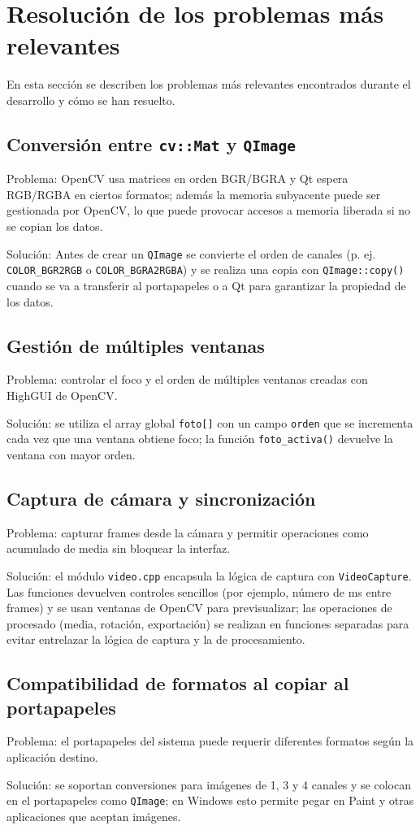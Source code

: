 \section{Resolución de los problemas más relevantes}

En esta sección se describen los problemas más relevantes encontrados durante el desarrollo y cómo se han resuelto.

\subsection{Conversión entre \texttt{cv::Mat} y \texttt{QImage}}

Problema: OpenCV usa matrices en orden BGR/BGRA y Qt espera RGB/RGBA en ciertos formatos; además la memoria subyacente puede ser gestionada por OpenCV, lo que puede provocar accesos a memoria liberada si no se copian los datos.

Solución: Antes de crear un \texttt{QImage} se convierte el orden de canales (p. ej. \texttt{COLOR\_BGR2RGB} o \texttt{COLOR\_BGRA2RGBA}) y se realiza una copia con \texttt{QImage::copy()} cuando se va a transferir al portapapeles o a Qt para garantizar la propiedad de los datos.

\subsection{Gestión de múltiples ventanas}

Problema: controlar el foco y el orden de múltiples ventanas creadas con HighGUI de OpenCV.

Solución: se utiliza el array global \texttt{foto[]} con un campo \texttt{orden} que se incrementa cada vez que una ventana obtiene foco; la función \texttt{foto\_activa()} devuelve la ventana con mayor orden.

\subsection{Captura de cámara y sincronización}

Problema: capturar frames desde la cámara y permitir operaciones como acumulado de media sin bloquear la interfaz.

Solución: el módulo \texttt{video.cpp} encapsula la lógica de captura con \texttt{VideoCapture}. Las funciones devuelven controles sencillos (por ejemplo, número de ms entre frames) y se usan ventanas de OpenCV para previsualizar; las operaciones de procesado (media, rotación, exportación) se realizan en funciones separadas para evitar entrelazar la lógica de captura y la de procesamiento.

\subsection{Compatibilidad de formatos al copiar al portapapeles}

Problema: el portapapeles del sistema puede requerir diferentes formatos según la aplicación destino.

Solución: se soportan conversiones para imágenes de 1, 3 y 4 canales y se colocan en el portapapeles como \texttt{QImage}; en Windows esto permite pegar en Paint y otras aplicaciones que aceptan imágenes.
